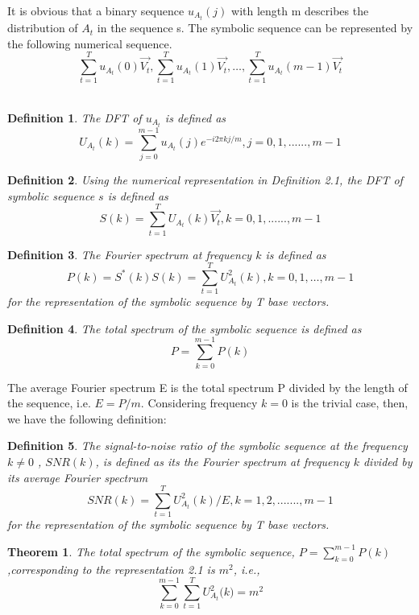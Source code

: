 \documentclass[preprint,authoryear,12pt]{elsarticle}
\newtheorem{definition}{Definition}[section]\newtheorem{theory}{Theory}
\newtheorem{thm}{Theorem}[section]
\begin{document}
It is obvious that a binary sequence  $u_{A_t } (j)$ with length m describes the distribution of $A_t $  in the sequence s. The symbolic sequence can be represented by the following numerical sequence.\\
$$\sum\limits_{t = 1}^T {u_{A_t } (0)\overrightarrow {V_t } } ,\sum\limits_{t = 1}^T {u_{A_t } (1)\overrightarrow {V_t } } , \ldots ,\sum\limits_{t = 1}^T {u_{A_t } (m-1) \overrightarrow {V_t } }$$
\\
\begin{definition}
 The DFT of  $u_{A_t }$   is defined as \\
$$
U_{A_t } (k) = \sum\limits_{j = 0}^{m - 1} {u_{A_t}(j)} e^{ - i2\pi kj/m} ,j = 0,1,......,m - 1
$$
\end{definition}
\begin{definition}
Using the numerical representation in Definition 2.1, the DFT of symbolic sequence $s$ is defined as\\
$$S(k) = \sum\limits_{t = 1}^T {U_{A_t }(k)} \overrightarrow {V_t } ,k = 0,1,......,m - 1$$
\end{definition}
\begin{definition}
The Fourier spectrum at frequency $k$ is defined as\\
$$P(k) = S^* (k)S(k) = \sum\limits_{t = 1}^T {U_{A_t}^2 (k)} ,k = 0,1, \ldots ,m - 1$$
for the representation of the symbolic sequence by T base vectors.
\end{definition}
\begin{definition}
The total spectrum of the symbolic sequence is defined as\\
$$P = \sum\limits_{k = 0}^{m - 1} {P(k)}$$
\end{definition}
The average Fourier spectrum E  is the total spectrum P divided by the length of the sequence, i.e. $E = P/m$. Considering frequency $k=0$ is the trivial case, then, we have the following definition:\\

\begin{definition} The signal-to-noise ratio of the symbolic sequence at the frequency $k \ne 0$ , $SNR(k)$, is defined as its the Fourier spectrum at frequency $k$ divided by its average Fourier spectrum\\
$$
SNR(k) = \sum\limits_{t = 1}^T {U_{A_t} ^2 (k)} /E,k = 1,2,.......,m - 1
$$
for the representation of the symbolic sequence by T base vectors.
\end{definition}

\begin{thm}
The total spectrum of the symbolic sequence, $P = \sum\limits_{k = 0}^{m - 1} {P(k)} $,corresponding to the representation 2.1 is ${m^{2}}$, i.e.,
$$
\sum\limits_{k = 0}^{m - 1} {\sum\limits_{t = 1}^T {U_{A_t}^2 (k} } ) = m^2
$$
\end{thm}
\end{document}
